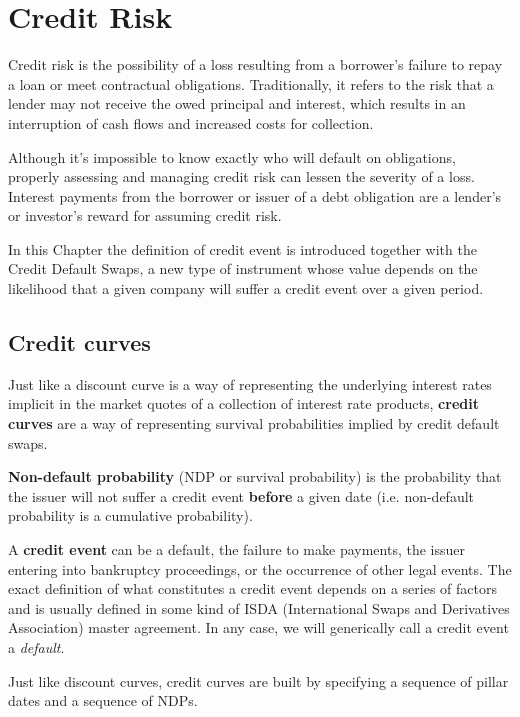 \chapter{Credit Risk}\label{credit_default_swaps}

Credit risk is the possibility of a loss resulting from a borrower's failure to repay a loan or meet contractual obligations. Traditionally, it refers to the risk that a lender may not receive the owed principal and interest, which results in an interruption of cash flows and increased costs for collection. 

Although it's impossible to know exactly who will default on obligations, properly assessing and managing credit risk can lessen the severity of a loss. Interest payments from the borrower or issuer of a debt obligation are a lender's or investor's reward for assuming credit risk.

In this Chapter the definition of credit event is introduced together with the Credit Default Swaps, a new type of instrument whose value depends on the likelihood that a given company will suffer a credit event over a given period.

\section{Credit curves}\label{credit-curves}

Just like a discount curve is a way of representing the underlying interest rates implicit in the market quotes of a collection of interest rate products, \textbf{credit curves} are a way of representing survival probabilities implied by credit default swaps.

\textbf{Non-default probability} (NDP or survival probability) is the probability that the issuer will not suffer a credit event \textbf{before} a given date (i.e. non-default probability is a cumulative probability).

A \textbf{credit event} can be a default, the failure to make payments, the issuer entering into bankruptcy proceedings, or the occurrence of other legal events. The exact definition of what constitutes a credit event depends on a series of factors and is usually defined in some kind of ISDA (International Swaps and Derivatives Association) master agreement. In any case, we will generically call a credit event a \emph{default}.

Just like discount curves, credit curves are built by specifying a sequence of pillar dates and a sequence of NDPs. 

